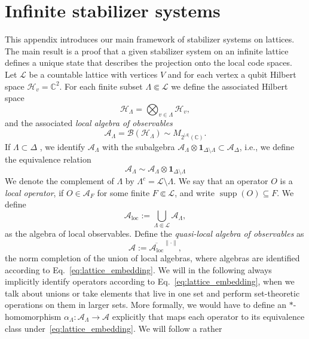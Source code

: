 \documentclass[aps,pra,reprint,superscriptaddress]{revtex4-2}
\newcommand{\bbC}{\mathbb C}
\newcommand{\cA}{{\mathcal A}}
\newcommand{\cB}{{\mathcal B}}
\newcommand{\cH}{{\mathcal H}}
\newcommand{\cL}{{\mathcal L}}
\renewcommand\a{\alpha}
\newcommand\D{\Delta}
\renewcommand\L{\Lambda}
\newcommand{\id}{\mathbf 1}
\theoremstyle{definition}
\theoremstyle{remark}
\begin{document}
\section{Infinite stabilizer systems}\label{app:lattice_systems}
This appendix introduces our main framework of stabilizer systems on lattices. The main result is a proof that a given stabilizer system on an infinite lattice defines a unique state that describes the projection onto the local code spaces.
Let $\cL$ be a countable lattice with vertices $V$ and for each vertex a qubit
Hilbert space $\cH_v = \mathbb{C}^2$. For each finite subset $\L \Subset \cL$
we define the associated Hilbert space
\begin{equation}
   \cH_\L = \bigotimes_{v \in \L} \cH_v,
\end{equation}
and the associated \emph{local algebra of observables}
\begin{equation}
    \cA_\L = \cB(\cH_\L) \sim M_{2^{|\L|}(\bbC)}.
\end{equation}
If $\Lambda \subset \Delta$ , we identify $\cA_\L$ with the subalgebra
$\cA_\L \otimes \id_{\D \setminus \L} \subset \cA_\D$, i.e., we define
the equivalence relation 
\begin{equation}\label{eq:lattice_embedding}
    \cA_\L \sim \cA_\L \otimes \id_{\D \setminus \L}
\end{equation}
We denote the complement of $\L$ by $\L^{c} = \cL \setminus \L$.
We say that an operator $O$ is a \emph{local operator}, if
$O\in\cA_F$ for some finite $F\Subset\cL$, and write
$\operatorname{supp}(O)\subseteq F$.
We define
\begin{equation}
    \cA_{\text{loc}}:=\bigcup_{\L\Subset\cL}\cA_{\L},
\end{equation}
as the algebra of local observables. Define the \emph{quasi-local algebra of
observables} as
\begin{equation}
    \cA:=\overline{\cA_{\text{loc}}}^{\|\cdot\|},
\end{equation}
the norm completion of the union of local algebras, where algebras are
identified according to Eq.~\eqref{eq:lattice_embedding}. We will in the
following always implicitly identify operators according to Eq.~\eqref{eq:lattice_embedding}, when we talk about unions or take elements that
live in one set and perform set-theoretic operations on them in larger sets.
More formally, we would have to define an $\ast$-homomorphism $\a_{\L}:
\cA_{\L}\rightarrow \cA$ explicitly that maps each operator to its equivalence
class under~\eqref{eq:lattice_embedding}. We will follow a rather
\end{document}
